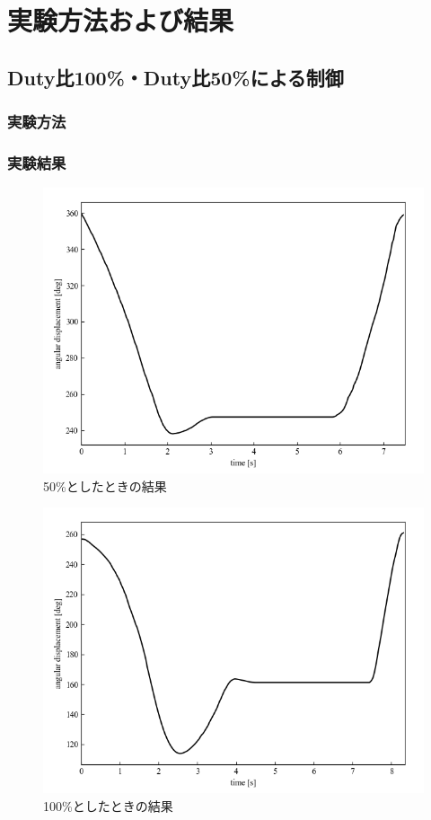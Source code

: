 \section{実験方法および結果}
\subsection{Duty比100\%・Duty比50\%による制御}
\subsubsection{実験方法}
\subsubsection{実験結果}

\begin{figure}[H]
	\centering
		\includegraphics[scale=0.5]{./figure/5kb.png}
		\caption{50\%としたときの結果}
		\label{fig:fif}
\end{figure}

\begin{figure}[H]
	\centering
		\includegraphics[scale=0.5]{./figure/fif.png}
		\caption{100\%としたときの結果}
		\label{fig:hund}
\end{figure}

